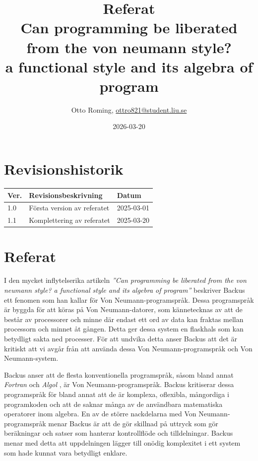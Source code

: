 \documentclass{TDP003mall}
\author{Otto Roming, \url{ottro821@student.liu.se}}
\title{Referat\\
\large Can programming be liberated from the von neumann style? \\ a functional
style and its algebra of program}
\date{2026-03-20}
\begin{document}
\projectpage
\section{Revisionshistorik}
\begin{table}[!h]
\begin{tabularx}{\linewidth}{|l|X|l|}
\hline
Ver. & Revisionsbeskrivning & Datum \\\hline
1.0 & Första version av referatet & 2025-03-01 \\\hline
1.1 & Komplettering av referatet & 2025-03-20 \\\hline
\end{tabularx}
\end{table}

\section{Referat}
I den mycket inflytelserika artikeln \textit{''Can programming be liberated from the von neumann style? a functional style and its algebra of program''} beskriver Backus \cite{backus_can_1978} ett fenomen som han kallar för Von Neumann-programspråk. Dessa programspråk är byggda för att köras på Von Neumann-datorer, som kännetecknas av att de består av processorer och minne där endast ett ord av data kan fraktas mellan processorn och minnet åt gången. Detta ger dessa system en flaskhals som kan betydligt sakta ned processer. För att undvika detta anser Backus\cite{backus_can_1978} att det är kritiskt att vi avgår från att använda dessa Von Neumann-programspråk och Von Neumann-system.

Backus \cite{backus_can_1978} anser att de flesta konventionella programspråk, såsom bland annat \textit{Fortran} och \textit{Algol} , är Von Neumann-programspråk. Backus \cite{backus_can_1978} kritiserar dessa programspråk för bland annat att de är komplexa, oflexibla, mångordiga i programkoden och att de saknar många av de användbara matematiska operatorer inom algebra. En av de större nackdelarna med Von Neumann-programspråk menar Backus \cite{backus_can_1978} är att de gör skillnad på uttryck som gör beräkningar och satser som hanterar kontrollflöde och tilldelningar. Backus \cite{backus_can_1978} menar med detta att uppdelningen lägger till onödig komplexitet i ett system som hade kunnat vara betydligt enklare.
\end{document}
